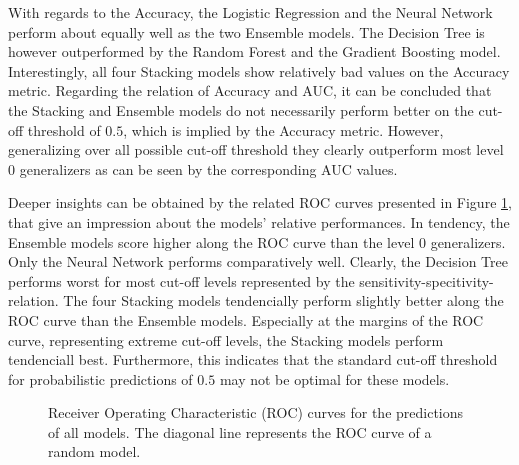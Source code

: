 \documentclass[12pt]{article}
\begin{document}
With regards to the Accuracy, the Logistic Regression and the Neural Network perform about equally well as the two Ensemble models. The Decision Tree is however outperformed by the Random Forest and the Gradient Boosting model. Interestingly, all four Stacking models show relatively bad values on the Accuracy metric. Regarding the relation of Accuracy and AUC, it can be concluded that the Stacking and Ensemble models do not necessarily perform better on the cut-off threshold of $0.5$, which is implied by the Accuracy metric. However, generalizing over all possible cut-off threshold they clearly outperform most level 0 generalizers as can be seen by the corresponding AUC values. 

Deeper insights can be obtained by the related ROC curves presented in Figure \ref{aucplot}, that give an impression about the models' relative performances. In tendency, the Ensemble models score higher along the ROC curve than the level 0 generalizers. Only the Neural Network performs comparatively well. Clearly, the Decision Tree performs worst for most cut-off levels represented by the sensitivity-specitivity-relation. The four Stacking models tendencially perform slightly better along the ROC curve than the Ensemble models. Especially at the margins of the ROC curve, representing extreme cut-off levels, the Stacking models perform tendenciall best. Furthermore, this indicates that the standard cut-off threshold for probabilistic predictions of $0.5$ may not be optimal for these models.

\begin{figure}[!htp] 
\caption[ROC curves]{Receiver Operating Characteristic (ROC) curves for the predictions of all models. The diagonal line represents the ROC curve of a random model.}\label{aucplot}
\end{figure} 
\end{document}
